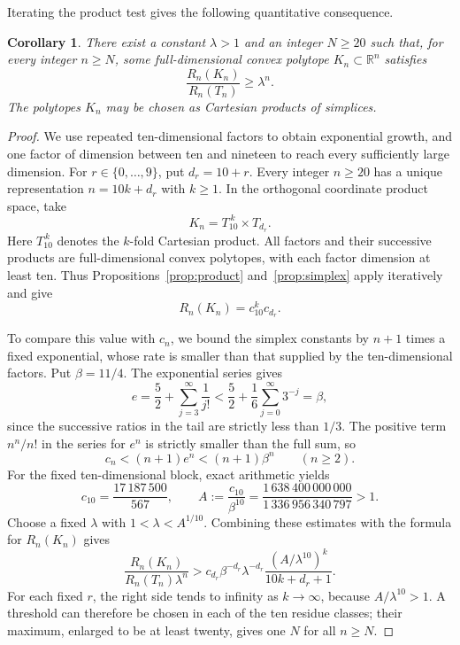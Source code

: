 \documentclass[11pt]{article}
\newtheorem{corollary}[theorem]{Corollary}
\newcommand{\R}{\mathbb R}
\begin{document}
Iterating the product test gives the following quantitative consequence.

\begin{corollary}\label{cor:exponential-excess}
There exist a constant \(\lambda>1\) and an integer \(N\ge20\) such that, for every
integer \(n\ge N\), some full-dimensional convex polytope
\(K_n\subset\R^n\) satisfies
\[
 \frac{R_n(K_n)}{R_n(T_n)}\ge\lambda^n.
\]
The polytopes \(K_n\) may be chosen as Cartesian products of simplices.
\end{corollary}

\begin{proof}
We use repeated ten-dimensional factors to obtain exponential growth,
and one factor of dimension between ten and nineteen to reach every
sufficiently large dimension. For \(r\in\{0,\ldots,9\}\), put
\(d_r=10+r\). Every integer \(n\ge20\) has a unique representation
\(n=10k+d_r\) with \(k\ge1\). In the orthogonal coordinate product
space, take
\[
 K_n=T_{10}^{\,k}\times T_{d_r}.
\]
Here \(T_{10}^{\,k}\) denotes the \(k\)-fold Cartesian product. All
factors and their successive products are full-dimensional convex
polytopes, with each factor dimension at least ten. Thus
Propositions~\ref{prop:product} and~\ref{prop:simplex} apply iteratively
and give
\[
 R_n(K_n)=c_{10}^k c_{d_r}.
\]

To compare this value with \(c_n\), we bound the simplex constants by
\(n+1\) times a fixed exponential, whose rate is smaller than that
supplied by the ten-dimensional factors. Put \(\beta=11/4\).
The exponential series gives
\[
 e=\frac52+\sum_{j=3}^{\infty}\frac1{j!}
 <\frac52+\frac16\sum_{j=0}^{\infty}3^{-j}
 =\beta,
\]
since the successive ratios in the tail are strictly less than \(1/3\).
The positive term \(n^n/n!\) in the series for \(e^n\) is strictly
smaller than the full sum, so
\[
 c_n<(n+1)e^n<(n+1)\beta^n\qquad(n\ge2).
\]
For the fixed ten-dimensional block, exact arithmetic yields
\[
 c_{10}=\frac{17\,187\,500}{567},\qquad
 A:=\frac{c_{10}}{\beta^{10}}
 =\frac{1\,638\,400\,000\,000}{1\,336\,956\,340\,797}>1.
\]
Choose a fixed \(\lambda\) with \(1<\lambda<A^{1/10}\). Combining
these estimates with the formula for \(R_n(K_n)\) gives
\[
 \frac{R_n(K_n)}{R_n(T_n)\lambda^n}
 >c_{d_r}\beta^{-d_r}\lambda^{-d_r}
   \frac{(A/\lambda^{10})^k}{10k+d_r+1}.
\]
For each fixed \(r\), the right side tends to infinity as \(k\to\infty\),
because \(A/\lambda^{10}>1\). A threshold can therefore be chosen in
each of the ten residue classes; their maximum, enlarged to be at least
twenty, gives one \(N\) for all \(n\ge N\).
\end{proof}


\end{document}
